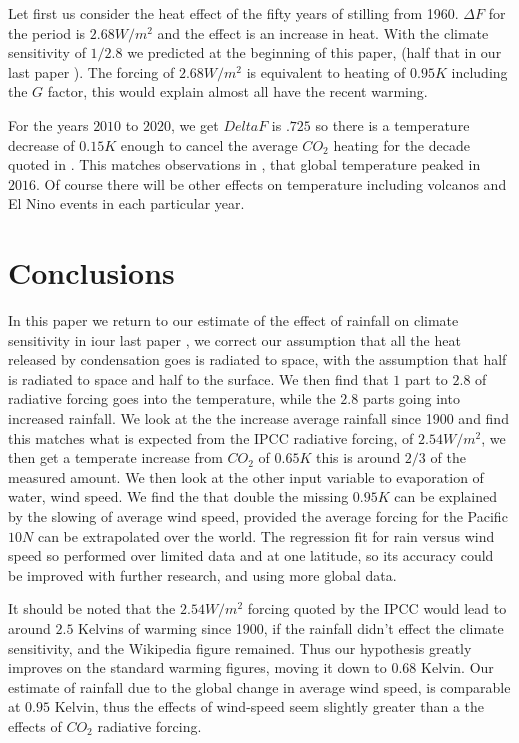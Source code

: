 \documentclass{book}
\begin{document}
   Let first us consider the heat effect of the fifty years of stilling from 1960. $\Delta F $ for the period is $2.68 W/m^2$ and the effect is an increase in heat. With the climate sensitivity of $1/2.8$ we predicted at the beginning of this paper, (half that in our last paper \cite{Adams}). The forcing of $2.68 W/m^2$ is equivalent to heating of $0.95K$ including the $G$ factor, this would explain almost all have the recent warming.
   
   For the years $2010$ to $2020$, we get $Delta F $ is $.725$ so there is a temperature decrease of $0.15K$ enough to cancel the average $CO_2$ heating for the decade quoted in \cite{GlobTemp}. This matches observations in  \cite{GlobTemp}, that global temperature peaked in $2016$. Of course there will be other effects on temperature including volcanos and El Nino events in each particular year.
   
           	
   \section{Conclusions}
   
   In this paper we return to our estimate of the effect of rainfall on climate sensitivity in iour last paper \cite{Adams1}, we correct our assumption that all the heat released by condensation goes is radiated to space, with the
   assumption that half is radiated to space and half to the surface. We then find that $1$ part to $2.8$ of radiative forcing goes into the temperature, while the $2.8$ parts going into increased rainfall. We look at the the increase average rainfall since 1900 and find this matches what is expected from the IPCC radiative forcing, \cite{Radiative} of $2.54 W/m^2$, we then get a temperate increase from $CO_2$ of $0.65K$ this is around $2/3$ of the measured amount. We then look at the other input variable to evaporation of water, wind speed. We find the that double the missing $0.95K$ can be explained by the slowing of average wind speed, provided the average forcing for the Pacific $10N$ can be extrapolated over the world. The regression fit for rain versus wind speed so performed over limited data and at one latitude, so its accuracy could be improved with further research, and using more global data.
   
    It should be noted that the $2.54 W/m^2$ forcing quoted by the IPCC \cite{Radiative} would lead to around $2.5$ Kelvins of warming since 1900, if the rainfall didn't effect the climate sensitivity, and the Wikipedia \cite{wikisense} figure remained. Thus our hypothesis greatly improves on the standard warming figures, moving it down to $0.68$ Kelvin. Our estimate of rainfall due to the global change in average wind speed, is comparable at $0.95$ Kelvin,
     thus the effects of wind-speed seem slightly greater than a the effects of $CO_2$ radiative forcing.
    
\end{document}
